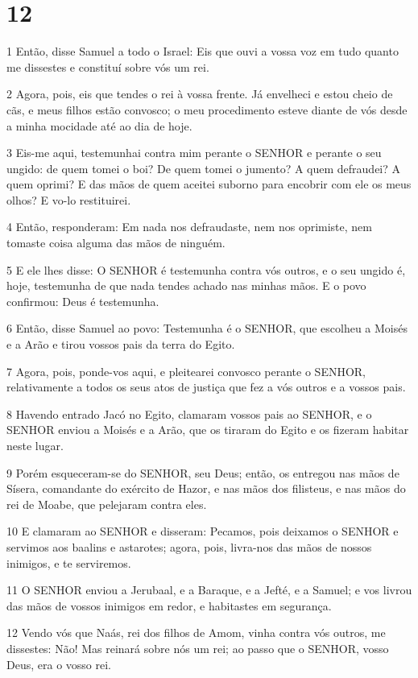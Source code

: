 \chapter{12}

\par 1 Então, disse Samuel a todo o Israel: Eis que ouvi a vossa voz em tudo quanto me dissestes e constituí sobre vós um rei.
\par 2 Agora, pois, eis que tendes o rei à vossa frente. Já envelheci e estou cheio de cãs, e meus filhos estão convosco; o meu procedimento esteve diante de vós desde a minha mocidade até ao dia de hoje.
\par 3 Eis-me aqui, testemunhai contra mim perante o SENHOR e perante o seu ungido: de quem tomei o boi? De quem tomei o jumento? A quem defraudei? A quem oprimi? E das mãos de quem aceitei suborno para encobrir com ele os meus olhos? E vo-lo restituirei.
\par 4 Então, responderam: Em nada nos defraudaste, nem nos oprimiste, nem tomaste coisa alguma das mãos de ninguém.
\par 5 E ele lhes disse: O SENHOR é testemunha contra vós outros, e o seu ungido é, hoje, testemunha de que nada tendes achado nas minhas mãos. E o povo confirmou: Deus é testemunha.
\par 6 Então, disse Samuel ao povo: Testemunha é o SENHOR, que escolheu a Moisés e a Arão e tirou vossos pais da terra do Egito.
\par 7 Agora, pois, ponde-vos aqui, e pleitearei convosco perante o SENHOR, relativamente a todos os seus atos de justiça que fez a vós outros e a vossos pais.
\par 8 Havendo entrado Jacó no Egito, clamaram vossos pais ao SENHOR, e o SENHOR enviou a Moisés e a Arão, que os tiraram do Egito e os fizeram habitar neste lugar.
\par 9 Porém esqueceram-se do SENHOR, seu Deus; então, os entregou nas mãos de Sísera, comandante do exército de Hazor, e nas mãos dos filisteus, e nas mãos do rei de Moabe, que pelejaram contra eles.
\par 10 E clamaram ao SENHOR e disseram: Pecamos, pois deixamos o SENHOR e servimos aos baalins e astarotes; agora, pois, livra-nos das mãos de nossos inimigos, e te serviremos.
\par 11 O SENHOR enviou a Jerubaal, e a Baraque, e a Jefté, e a Samuel; e vos livrou das mãos de vossos inimigos em redor, e habitastes em segurança.
\par 12 Vendo vós que Naás, rei dos filhos de Amom, vinha contra vós outros, me dissestes: Não! Mas reinará sobre nós um rei; ao passo que o SENHOR, vosso Deus, era o vosso rei.
